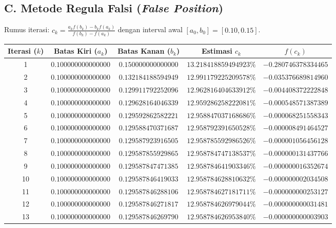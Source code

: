 \documentclass[11pt,a4paper]{article}
\begin{document}
\subsection*{C. Metode Regula Falsi (\textit{False Position})}
Rumus iterasi: $c_k = \frac{a_k f(b_k) - b_k f(a_k)}{f(b_k) - f(a_k)}$ dengan interval awal $[a_0, b_0] = [0.10, 0.15]$.

\begin{center}
\footnotesize
\setlength{\tabcolsep}{4pt}
\begin{tabular}{ccccc}
\toprule
\textbf{Iterasi ($k$)} & \textbf{Batas Kiri ($a_k$)} & \textbf{Batas Kanan ($b_k$)} & \textbf{Estimasi $c_k$} & \textbf{$f(c_k)$} \\
\midrule
1 & $0.100000000000000$ & $0.150000000000000$ & $13.218418859494923\%$ & $-0.280746378334465$ \\
2 & $0.100000000000000$ & $0.132184188594949$ & $12.991179225209578\%$ & $-0.035376689814960$ \\
3 & $0.100000000000000$ & $0.129911792252096$ & $12.962816404633912\%$ & $-0.004408372222848$ \\
4 & $0.100000000000000$ & $0.129628164046339$ & $12.959286258222081\%$ & $-0.000548571387389$ \\
5 & $0.100000000000000$ & $0.129592862582221$ & $12.958847037168686\%$ & $-0.000068251558343$ \\
6 & $0.100000000000000$ & $0.129588470371687$ & $12.958792391650528\%$ & $-0.000008491464527$ \\
7 & $0.100000000000000$ & $0.129587923916505$ & $12.958785592986526\%$ & $-0.000001056456128$ \\
8 & $0.100000000000000$ & $0.129587855929865$ & $12.958784747138537\%$ & $-0.000000131437766$ \\
9 & $0.100000000000000$ & $0.129587847471385$ & $12.958784641903346\%$ & $-0.000000016352674$ \\
10 & $0.100000000000000$ & $0.129587846419033$ & $12.958784628810632\%$ & $-0.000000002034508$ \\
11 & $0.100000000000000$ & $0.129587846288106$ & $12.958784627181711\%$ & $-0.000000000253127$ \\
12 & $0.100000000000000$ & $0.129587846271817$ & $12.958784626979044\%$ & $-0.000000000031481$ \\
13 & $0.100000000000000$ & $0.129587846269790$ & $\mathbf{12.958784626953840\%}$ & $-0.000000000003903$ \\
\bottomrule
\end{tabular}
\end{center}
\end{document}
